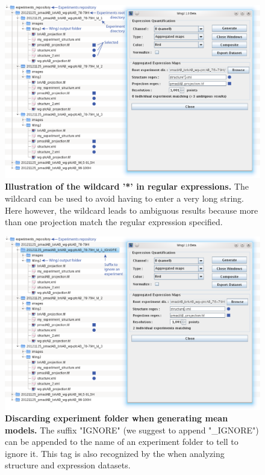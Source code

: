 \begin{figure}[!h]
\centering
\includegraphics[scale=1.2]{images/regex3_cropped_1440.png}
\caption{\textbf{Illustration of the wildcard '*' in regular expressions.} The wildcard can be used to avoid having to enter a very long string. Here however, the wildcard leads to ambiguous results because more than one projection match the regular expression specified.}
\label{fig:wingj_regex3}
\end{figure}

\begin{figure}[!h]
\centering
\includegraphics[scale=1.2]{images/regex4_cropped_1440.png}
\caption{\textbf{Discarding experiment folder when generating mean models.} The suffix "IGNORE" (we suggest to append "\_IGNORE") can be appended to the name of an experiment folder to tell \wingj to ignore it. This tag is also recognized by the \wingjMatlab when analyzing structure and expression datasets.}
\label{fig:wingj_regex4}
\end{figure}

